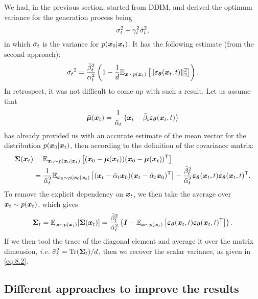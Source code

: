 We had, in the previous section, started from DDIM, and derived the optimum variance for the generation process being
\begin{equation}
    \label{eq:8.1}
    \sigma_t^2+\gamma_t^2 \bar{\sigma}_t^2,
\end{equation}
in which $\bar{\sigma}_t$ is the variance for $p(\bm{x}_0|\bm{x}_{t})$. It has the following estimate (from the second approach):
\begin{equation}
    \label{eq:8.2}
    \bar{\sigma_t}^2=\frac{\bar{\beta}_t^2}{\bar{\alpha}_t^2}\left(1-\frac{1}{d}\mathbb{E}_{\bm{x}\sim p(\bm{x}_{t})} \left[ \| \bm{\varepsilon}_{\bm{\theta}}(\bm{x}_{t},t)\|_2^2\right] \right).
\end{equation}
In retrospect, it was not difficult to come up with such a result. Let us assume that 
\begin{equation}
\label{eq:8.3}
    \bar{\bm{\mu}}(\bm{x}_{t}) =\frac{1}{\bar{\alpha}_t}\left(\bm{x}_{t}-\bar{\beta}_t\bm{\varepsilon}_{\bm{\theta}}(\bm{x}_{t},t) \right)
\end{equation}
has already provided us with an accurate estimate of the mean vector for the distribution $p(\bm{x}_0|\bm{x}_{t})$, then according to the definition of the covariance matrix:
\begin{align}
    \bm{\Sigma}(\bm{x}_{t})&=\mathbb{E}_{\bm{x}_0\sim p(\bm{x}_0|\bm{x}_{t})} \left[(\bm{x}_0-\bar{\bm{\mu}}(\bm{x}_{t})) (\bm{x}_0-\bar{\bm{\mu}}(\bm{x}_{t}))^{\mathsf{T}} \right] \nonumber\\
    &=\frac{1}{\bar{\alpha}_t^2}\mathbb{E}_{\bm{x}_0\sim p(\bm{x}_0|\bm{x}_{t})} \left[ (\bm{x}_{t}-\bar{\alpha}_t\bm{x}_0)(\bm{x}_{t}-\bar{\alpha}_t\bm{x}_0)^{\mathsf{T}} \right] -\frac{\bar{\beta}_t^2}{\bar{\alpha}_t^2}\bm{\varepsilon}_{\bm{\theta}}(\bm{x}_{t},t)\bm{\varepsilon}_{\bm{\theta}}(\bm{x}_{t},t)^{\mathsf{T}}.\label{eq:8.4}
\end{align}
To remove the explicit dependency on $\bm{x}_{t}$, we then take the average over $\bm{x}_{t}\sim p(\bm{x}_{t})$, which gives
\begin{equation}
    \label{eq:8.5}
    \bm{\Sigma}_t=\mathbb{E}_{\bm{x}\sim p(\bm{x}_{t})}[\bm{\Sigma}(\bm{x}_{t})]=\frac{\bar{\beta}_t^2}{\bar{\alpha}_t^2}\left(\bm{I}-\mathbb{E}_{\bm{x}\sim p(\bm{x}_{t})}\left[\bm{\varepsilon}_{\bm{\theta}}(\bm{x}_{t},t)\bm{\varepsilon}_{\bm{\theta}}(\bm{x}_{t},t)^{\mathsf{T}} \right]\right).
\end{equation}
If we then tool the trace of the diagonal element and average it over the matrix dimension, \emph{i.e.} $\bar{\sigma}_t^2=\mbox{Tr}(\bm{\Sigma}_t)/d$, then we recover the scalar variance, as given in \cref{eq:8.2}.

\subsection{Different approaches to improve the results}


